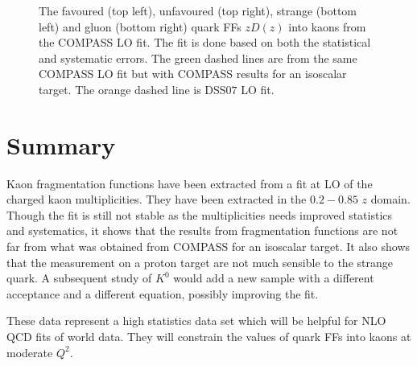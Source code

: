 \begin{figure}[!h]
	\caption{The favoured (top left), unfavoured (top right), strange (bottom left) and gluon (bottom right) quark FFs $zD(z)$ into kaons from the COMPASS LO fit. The fit is done based on both the statistical and systematic errors. The green dashed lines are from the same COMPASS LO fit but with COMPASS results for an isoscalar target. The orange dashed line is DSS$07$ LO fit.}
	\label{pic:FFFit}
\end{figure}


\newpage

\section{Summary}

Kaon fragmentation functions have been extracted from a fit at LO of the charged kaon multiplicities. They have been extracted in the $0.2-0.85$ $z$ domain. Though the fit is still not stable as the multiplicities needs improved statistics and systematics, it shows that the results from fragmentation functions are not far from what was obtained from COMPASS for an isoscalar target. It also shows that the measurement on a proton target are not much sensible to the strange quark. A subsequent study of $K^0$ would add a new sample with a different acceptance and a different equation, possibly improving the fit.

These data represent a high statistics data set which will be helpful for NLO QCD fits of world data. They will constrain the values of quark FFs into kaons at moderate $Q^2$.
